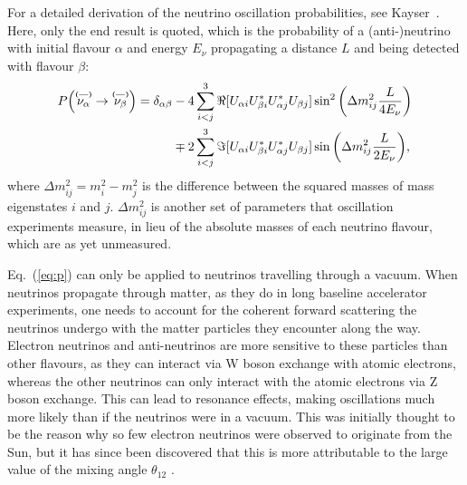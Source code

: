 \documentclass[aps,pra,12pt,notitlepage,tightenlines]{revtex4-1}
\newcommand\barparen[1]{\overset{\textbf{\fontsize{5pt}{5pt}\selectfont(---)}}{#1}}
\begin{document}
For a detailed derivation of the neutrino oscillation probabilities, see Kayser~\cite{Kayser:2011jn}. Here, only the end result is quoted, which is the probability of a \mbox{(anti-)neutrino} with initial flavour $\alpha$ and energy $E_\nu$ propagating a distance $L$ and being detected with flavour $\beta$:
\begin{align}
\label{eq:p}
P\Big(\barparen{\nu_\alpha}\rightarrow\barparen{\nu_\beta}\Big) = \delta_{\alpha\beta}&-4\sum^3_{i<j}\Re[U_{\alpha i}U_{\beta i}^*U_{\alpha j}^*U_{\beta j}]\sin^2\bigg(\Delta m^2_{ij}\frac{L}{4E_\nu}\bigg) \notag \\
& \mp 2\sum^3_{i<j}\Im[U_{\alpha i}U_{\beta i}^*U_{\alpha j}^*U_{\beta j}]\sin\bigg(\Delta m^2_{ij}\frac{L}{2E_\nu}\bigg),
\end{align}
where $\Delta m^2_{ij} = m^2_i - m^2_j$ is the difference between the squared masses of mass eigenstates $i$ and $j$. $\Delta m^2_{ij}$ is another set of parameters that oscillation experiments measure, in lieu of the absolute masses of each neutrino flavour, which are as yet unmeasured.

Eq.~(\ref{eq:p}) can only be applied to neutrinos travelling through a vacuum. When neutrinos propagate through matter, as they do in long baseline accelerator experiments, one needs to account for the coherent forward scattering the neutrinos undergo with the matter particles they encounter along the way. Electron neutrinos and anti-neutrinos are more sensitive to these particles than other flavours, as they can interact via W boson exchange with atomic electrons, whereas the other neutrinos can only interact with the atomic electrons via Z boson exchange. This can lead to resonance effects, making oscillations much more likely than if the neutrinos were in a vacuum. This was initially thought to be the reason why so few electron neutrinos were observed to originate from the Sun, but it has since been discovered that this is more attributable to the large value of the mixing angle $\theta_{12}$ \cite{Kayser:2005cd}.
\end{document}
